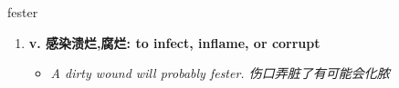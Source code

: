 
\begin{frame}
{\huge fester}
\begin{center}
\begin{enumerate}\Large
  \item \textbf{v. 感染溃烂,腐烂: to infect, inflame, or corrupt}
  \begin{itemize}
    \item \em{\Large{A dirty wound will probably fester. 伤口弄脏了有可能会化脓}}
  \end{itemize}
\end{enumerate}
\end{center}
\end{frame}
